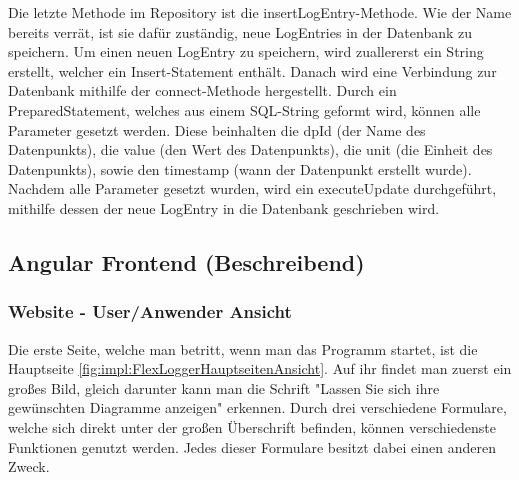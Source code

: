 Die letzte Methode im Repository ist die insertLogEntry-Methode. Wie der Name bereits verrät, ist sie dafür zuständig, neue LogEntries in der Datenbank zu speichern. Um einen neuen LogEntry zu speichern, wird zuallererst ein String erstellt, welcher ein Insert-Statement enthält. 
Danach wird eine Verbindung zur Datenbank mithilfe der connect-Methode hergestellt. Durch ein PreparedStatement, welches aus einem SQL-String geformt wird, können alle Parameter gesetzt werden. Diese beinhalten die dpId (der Name des Datenpunkts), die value (den Wert des Datenpunkts), die unit (die Einheit des Datenpunkts), sowie den timestamp (wann der Datenpunkt erstellt wurde). Nachdem alle Parameter gesetzt wurden, wird ein executeUpdate durchgeführt, mithilfe dessen der neue LogEntry in die Datenbank geschrieben wird. 

\subsection{Angular Frontend (Beschreibend)}



\subsubsection{Website - User/Anwender Ansicht}
Die erste Seite, welche man betritt, wenn man das Programm startet, ist die Hauptseite \ref{fig:impl:FlexLoggerHauptseitenAnsicht}. Auf ihr findet man zuerst ein großes Bild, gleich darunter kann man die Schrift "Lassen Sie sich ihre gewünschten Diagramme anzeigen" erkennen. 
Durch drei verschiedene Formulare, welche sich direkt unter der großen Überschrift befinden, können verschiedenste Funktionen genutzt werden. Jedes dieser Formulare besitzt dabei einen anderen Zweck. 

